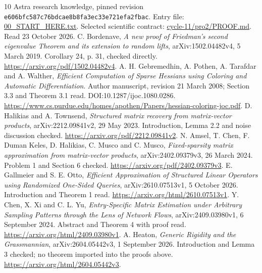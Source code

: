 \documentclass[11pt]{article}
\theoremstyle{remark}\newtheorem{remark}[theorem]{Remark}
\begin{document}
\begin{thebibliography}{10}
 Astra research knowledge, pinned revision \texttt{e606bfc587c76bdcae8b8fa3ec33e721efa2fbac}.
Entry file: \href{https://github.com/harjassand/astra-research-knowledge/blob/e606bfc587c76bdcae8b8fa3ec33e721efa2fbac/00_START_HERE.txt}{00\_START\_HERE.txt}.
Selected scientific contract: \href{https://github.com/harjassand/astra-research-knowledge/blob/e606bfc587c76bdcae8b8fa3ec33e721efa2fbac/research/2026-10-23-scientific-cycles/cycle-11/pro2/PROOF.md}{cycle-11/pro2/PROOF.md}. Read 23 October 2026.
 C. Bordenave, \emph{A new proof of Friedman's second eigenvalue Theorem and its extension to random lifts}, arXiv:1502.04482v4, 5 March 2019. Corollary 24, p. 31, checked directly. \url{https://arxiv.org/pdf/1502.04482v4}.
 A. H. Gebremedhin, A. Pothen, A. Tarafdar and A. Walther, \emph{Efficient Computation of Sparse Hessians using Coloring and Automatic Differentiation}. Author manuscript, revision 21 March 2008; Section 3.3 and Theorem 3.1 read. DOI:10.1287/ijoc.1080.0286. \url{https://www.cs.purdue.edu/homes/apothen/Papers/hessian-coloring-joc.pdf}.
 D. Halikias and A. Townsend, \emph{Structured matrix recovery from matrix-vector products}, arXiv:2212.09841v2, 29 May 2023. Introduction, Lemma 2.2 and noise discussion checked. \url{https://arxiv.org/pdf/2212.09841v2}.
 N. Amsel, T. Chen, F. Duman Keles, D. Halikias, C. Musco and C. Musco, \emph{Fixed-sparsity matrix approximation from matrix-vector products}, arXiv:2402.09379v3, 26 March 2024. Problem 1 and Section 6 checked. \url{https://arxiv.org/pdf/2402.09379v3}.
 E. Gallmeier and S. E. Otto, \emph{Efficient Approximation of Structured Linear Operators using Randomized One-Sided Queries}, arXiv:2610.07513v1, 5 October 2026. Introduction and Theorem 1 read. \url{https://arxiv.org/html/2610.07513v1}.
 Y. Chen, X. Xi and C. L. Yu, \emph{Entry-Specific Matrix Estimation under Arbitrary Sampling Patterns through the Lens of Network Flows}, arXiv:2409.03980v1, 6 September 2024. Abstract and Theorem 4 with proof read. \url{https://arxiv.org/html/2409.03980v1}.
 A. Heaton, \emph{Generic Rigidity and the Grassmannian}, arXiv:2604.05442v3, 1 September 2026. Introduction and Lemma 3 checked; no theorem imported into the proofs above. \url{https://arxiv.org/html/2604.05442v3}.
\end{thebibliography}
\end{document}
